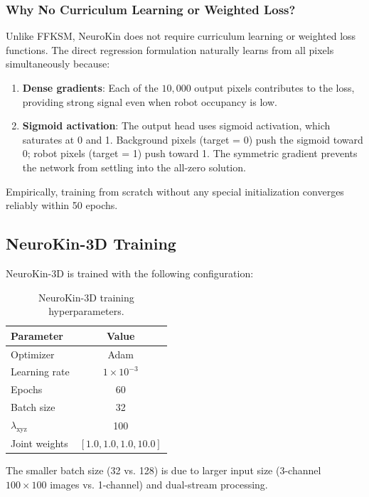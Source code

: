 \documentclass[12pt,a4paper,oneside]{report}
\begin{document}
\subsubsection{Why No Curriculum Learning or Weighted Loss?}

Unlike FFKSM, NeuroKin does not require curriculum learning or weighted loss functions. The direct regression formulation naturally learns from all pixels simultaneously because:

\begin{enumerate}
    \item \textbf{Dense gradients}: Each of the $10,000$ output pixels contributes to the loss, providing strong signal even when robot occupancy is low.
    \item \textbf{Sigmoid activation}: The output head uses sigmoid activation, which saturates at 0 and 1. Background pixels (target = 0) push the sigmoid toward 0; robot pixels (target = 1) push toward 1. The symmetric gradient prevents the network from settling into the all-zero solution.
\end{enumerate}

Empirically, training from scratch without any special initialization converges reliably within 50 epochs.

\subsection{NeuroKin-3D Training}

NeuroKin-3D is trained with the following configuration:

\begin{table}[H]
\centering
\caption{NeuroKin-3D training hyperparameters.}
\label{tab:neurokin3d_hyperparams}
\begin{tabular}{lc}
\toprule
Parameter & Value \\
\midrule
Optimizer & Adam \\
Learning rate & $1 \times 10^{-3}$ \\
Epochs & 60 \\
Batch size & 32 \\
$\lambda_{\text{xyz}}$ & 100 \\
Joint weights & $[1.0, 1.0, 1.0, 10.0]$ \\
\bottomrule
\end{tabular}
\end{table}

The smaller batch size (32 vs. 128) is due to larger input size (3-channel $100 \times 100$ images vs. 1-channel) and dual-stream processing.
\end{document}
